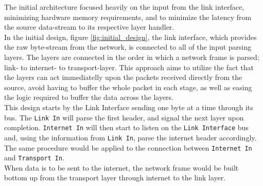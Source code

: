 The initial architecture focused heavily on the input from the link interface, 
minimizing hardware memory requirements, and to minimize the latency from the 
source data-stream to its respective layer handler.\\
In the initial design, figure \ref{fig:initial_design}, the link interface, which
provides the raw byte-stream from the network, is connected to all of the input
parsing layers. The layers are connected in the order in which a network frame 
is parsed; link- to internet- to transport-layer. This approach aims to utilize
the fact that the layers can act immediatelly upon the packets received directly
from the source, avoid having to buffer the whole packet in each stage, as well 
as easing the logic required to buffer the data across the layers.\\
This design starts by the Link Interface sending one byte at a time through its bus. 
The \texttt{Link In} will parse the first header, and signal the next layer upon completion.
\texttt{Internet In} will then start to listen on the \texttt{Link Interface} bus
and, using the information from \texttt{Link In}, parse the internet header 
accordingly. The same procedure would be applied to the connection between 
\texttt{Internet In} and \texttt{Transport In}.\\
When data is to be sent to the internet, the network frame would be built bottom
up from the transport layer through internet to the link layer.

